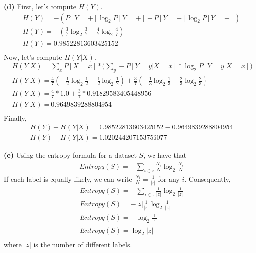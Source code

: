 \documentclass[leqno]{article}
\begin{document}
\noindent \textbf{(d)} First, let's compute $H(Y)$. 
\begin{equation*}
\begin{split}
&H(Y) = -(P[Y = +]\log_2P[Y = +] + P[Y = -]\log_2P[Y = -]) \\
&H(Y) = -(\frac{3}{7}\log_2\frac{3}{7} + \frac{4}{7}\log_2\frac{4}{7}) \\
&H(Y) = 0.98522813603425152 \\
\end{split}
\end{equation*} 
Now, let's compute $H(Y|X)$.
\begin{equation*}
\begin{split}
&H(Y|X) = \sum_xP[X = x] * \Big(\sum_y-P[Y = y| X = x]*\log_2P[Y = y| X = x]\Big) \\
&H(Y|X) = \frac{4}{7}(-\frac{1}{2}\log_2\frac{1}{2} - \frac{1}{2}\log_2\frac{1}{2}) + \frac{3}{7}(-\frac{1}{3}\log_2\frac{1}{3} - \frac{2}{3}\log_2\frac{2}{3})\\
&H(Y|X) = \frac{4}{7}*1.0 + \frac{3}{7}* 0.91829583405448956\\
&H(Y|X) = 0.9649839288804954\\
\end{split}
\end{equation*} 
Finally,
\begin{equation*}
\begin{split}
&H(Y) - H(Y|X) = 0.98522813603425152 - 0.9649839288804954 \\
&H(Y) - H(Y|X) = 0.020244207153756077
\end{split}
\end{equation*} 

\hfill

\noindent \textbf{(e)} Using the entropy formula for a dataset $S$, we have that
\begin{equation*}
\begin{split}
&Entropy(S) = -\sum_{i \in z}\frac{N_i}{N}\log_2\frac{N_i}{N}
\end{split}
\end{equation*} 
If each label is equally likely, we can write $\frac{N_i}{N} = \frac{1}{|z|}$ for any $i$. Consequently,
\begin{equation*}
\begin{split}
&Entropy(S) = -\sum_{i \in z}\frac{1}{|z|}\log_2\frac{1}{|z|}\\
&Entropy(S) = -|z|\frac{1}{|z|}\log_2\frac{1}{|z|}\\
&Entropy(S) = -\log_2\frac{1}{|z|}\\
&Entropy(S) = \log_2|z|\\
\end{split}
\end{equation*}
where $|z|$ is the number of different labels.  
\end{document}
